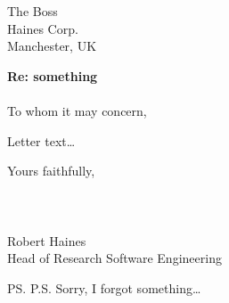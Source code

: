 \documentclass{UoM_letter}
\begin{document}
\begin{letter}{The Boss \\ Haines Corp. \\ Manchester, UK}

\opening{\textbf{Re: something}\\\\To whom it may concern,}

Letter text\ldots



Yours faithfully,\\\\\\\\
Robert Haines\\
Head of Research Software Engineering

\ps{P.S. Sorry, I forgot something\ldots}

\end{letter}
\end{document}

